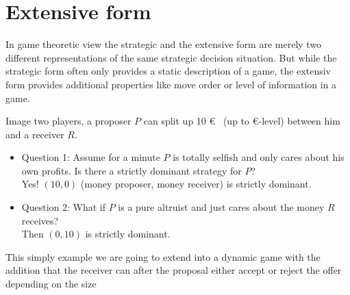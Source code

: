 

\section{Extensive form}

In game theoretic view the strategic and the extensive form are merely two different representations of the same strategic decision situation. But while the strategic form often only provides a static description of a game, the extensiv form provides additional properties like move order or level of information in a game.

\begin{example} 
Image two players, a proposer $P$ can split up 10 \euro ~ (up to \euro-level) between him and a receiver $R$. 
	\begin{itemize}
		\item Question 1: Assume for a minute $P$ is totally selfish and only cares about his own profits. Is there a strictly dominant strategy for $P$? \\
			Yes! $(10, 0)$ (money proposer, money receiver) is strictly dominant.
		\item Question 2: What if $P$ is a pure altruist and just cares about the money $R$ receives? \\
			Then $(0, 10)$ is strictly dominant.
	\end{itemize}
\end{example}

This simply example we are going to extend into a dynamic game with the addition that the receiver can after the proposal either accept or reject the offer depending on the size

